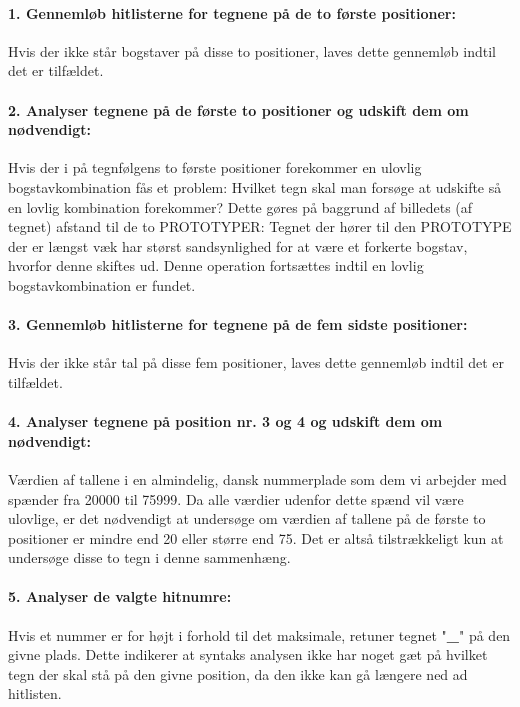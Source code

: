 \paragraph{1. Gennemløb hitlisterne for tegnene på de to første positioner:} Hvis der ikke står bogstaver på disse to positioner, laves dette gennemløb indtil det er tilfældet.
\paragraph{2. Analyser tegnene på de første to positioner og udskift dem om nødvendigt:}
Hvis der i på tegnfølgens to første positioner forekommer en ulovlig bogstavkombination fås et problem: Hvilket tegn skal man forsøge at udskifte så en lovlig kombination forekommer? Dette gøres på baggrund af billedets (af tegnet) afstand til de to PROTOTYPER: Tegnet der hører til den PROTOTYPE der er længst væk har størst sandsynlighed for at være et forkerte bogstav, hvorfor denne skiftes ud. Denne operation fortsættes indtil en lovlig bogstavkombination er fundet.

\paragraph{3. Gennemløb hitlisterne for tegnene på de fem sidste positioner:} Hvis der ikke står tal på disse fem positioner, laves dette gennemløb indtil det er tilfældet.

\paragraph{4. Analyser tegnene på position nr. 3 og 4 og udskift dem om nødvendigt:}
Værdien af tallene i en almindelig, dansk nummerplade som dem vi arbejder med spænder fra 20000 til 75999. Da alle værdier udenfor dette spænd vil være ulovlige, er det nødvendigt at undersøge om værdien af tallene på de første to positioner er mindre end 20 eller større end 75. Det er altså tilstrækkeligt kun at undersøge disse to tegn i denne sammenhæng.

\paragraph{5. Analyser de valgte hitnumre:} Hvis et nummer er for højt i forhold til det maksimale, retuner tegnet "\textbf{\_}" på den givne plads. Dette indikerer at syntaks analysen ikke har noget gæt på hvilket tegn der skal stå på den givne position, da den ikke kan gå længere ned ad hitlisten.

